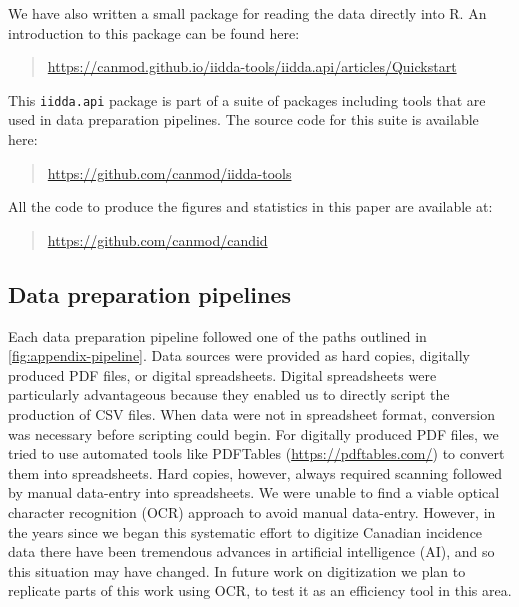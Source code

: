 \documentclass[12pt]{article}
\begin{document}
We have also written a small package for reading the data directly into R. An introduction to this package can be found here:
\begin{quote}
\url{https://canmod.github.io/iidda-tools/iidda.api/articles/Quickstart}
\end{quote}
This \texttt{iidda.api} package is part of a suite of packages including tools that are used in data preparation pipelines. The source code for this suite is available here:
\begin{quote}
\url{https://github.com/canmod/iidda-tools}
\end{quote}

All the code to produce the figures and statistics in this paper are available at:
\begin{quote}
\url{https://github.com/canmod/candid}
\end{quote}

\subsection{Data preparation pipelines}\label{sec:appendix-data-prep}

Each data preparation pipeline followed one of the paths outlined in \cref{fig:appendix-pipeline}. Data sources were provided as hard copies, digitally produced PDF files, or digital spreadsheets. Digital spreadsheets were particularly advantageous because they enabled us to directly script the production of CSV files. When data were not in spreadsheet format, conversion was necessary before scripting could begin. For digitally produced PDF files, we tried to use automated tools like PDFTables (\url{https://pdftables.com/}) to convert them into spreadsheets. Hard copies, however, always required scanning followed by manual data-entry into spreadsheets. We were unable to find a viable optical character recognition (OCR) approach to avoid manual data-entry. However, in the years since we began this systematic effort to digitize Canadian incidence data there have been tremendous advances in artificial intelligence (AI), and so this situation may have changed. In future work on digitization we plan to replicate parts of this work using OCR, to test it as an efficiency tool in this area.
\end{document}
